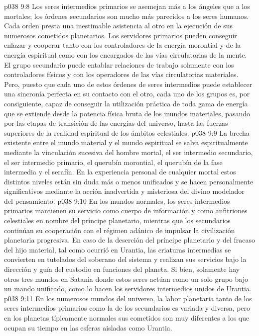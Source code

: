 \vs p038 9:8 Los seres intermedios primarios se asemejan más a los ángeles que a los mortales; los órdenes secundarios son mucho más parecidos a los seres humanos. Cada orden presta una inestimable asistencia al otro en la ejecución de sus numerosos cometidos planetarios. Los servidores primarios pueden conseguir enlazar y cooperar tanto con los controladores de la energía morontial y de la energía espiritual como con los encargados de las vías circulatorias de la mente. El grupo secundario puede entablar relaciones de trabajo solamente con los controladores físicos y con los operadores de las vías circulatorias materiales. Pero, puesto que cada uno de estos órdenes de seres intermedios puede establecer una sincronía perfecta en su contacto con el otro, cada uno de los grupos es, por consiguiente, capaz de conseguir la utilización práctica de toda gama de energía que se extiende desde la potencia física bruta de los mundos materiales, pasando por las etapas de transición de las energías del universo, hasta las fuerzas superiores de la realidad espiritual de los ámbitos celestiales.
\vs p038 9:9 La brecha existente entre el mundo material y el mundo espiritual se salva espiritualmente mediante la vinculación sucesiva del hombre mortal, el ser intermedio secundario, el ser intermedio primario, el querubín morontial, el querubín de la fase intermedia y el serafín. En la experiencia personal de cualquier mortal estos distintos niveles están sin duda más o menos unificados y se hacen personalmente significativos mediante la acción inadvertida y misteriosa del divino modelador del pensamiento.
\vs p038 9:10 \pc En los mundos normales, los seres intermedios primarios mantienen su servicio como cuerpo de información y como anfitriones celestiales en nombre del príncipe planetario, mientras que los secundarios continúan su cooperación con el régimen adánico de impulsar la civilización planetaria progresiva. En caso de la deserción del príncipe planetario y del fracaso del hijo material, tal como ocurrió en Urantia, las criaturas intermedias se convierten en tutelados del soberano del sistema y realizan sus servicios bajo la dirección y guía del custodio en funciones del planeta. Si bien, solamente hay otros tres mundos en Satania donde estos seres actúan como un solo grupo bajo un mando unificado, como lo hacen los servidores intermedios unidos de Urantia.
\vs p038 9:11 En los numerosos mundos del universo, la labor planetaria tanto de los seres intermedios primarios como la de los secundarios es variada y diversa, pero en los planetas típicamente normales sus cometidos son muy diferentes a los que ocupan su tiempo en las esferas aisladas como Urantia.
